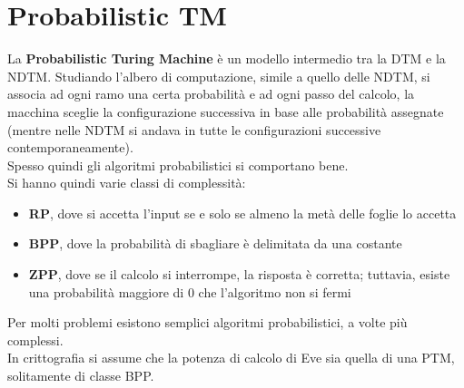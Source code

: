 \documentclass[a4paper,12pt, oneside]{book}
\begin{document}
\section{Probabilistic TM}
La \textbf{Probabilistic Turing Machine} è un modello intermedio tra la DTM e la
NDTM. Studiando l'albero di computazione, simile a quello delle NDTM, si associa
ad ogni ramo una certa probabilità e ad ogni passo del calcolo, la macchina
sceglie la configurazione successiva in base alle probabilità assegnate (mentre
nelle NDTM si andava in tutte le configurazioni successive
contemporaneamente). \\
Spesso quindi gli algoritmi probabilistici si comportano bene.\\
Si hanno quindi varie classi di complessità:
\begin{itemize}
  \item \textbf{RP}, dove si accetta l'input se e solo se almeno la metà delle
  foglie lo accetta 
  \item \textbf{BPP}, dove la probabilità di sbagliare è delimitata da una
  costante  
  \item \textbf{ZPP}, dove se il calcolo si
  interrompe, la risposta è corretta; tuttavia, esiste una probabilità maggiore
  di 0 che l'algoritmo non si fermi  
\end{itemize}
Per molti problemi esistono semplici algoritmi probabilistici, a volte più
complessi. \\
In crittografia si assume che la potenza di calcolo di Eve sia quella di una
PTM, solitamente di classe BPP.
\end{document}
